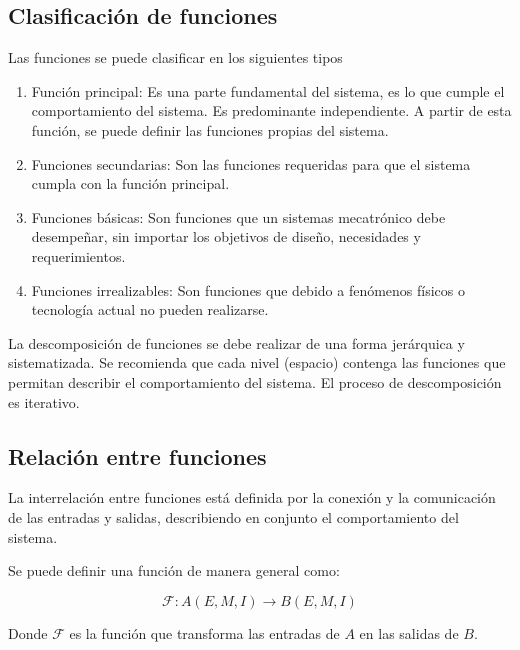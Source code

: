 \subsection{Clasificación de funciones}
Las funciones se puede clasificar en los siguientes tipos
\begin{enumerate}
    \item Función principal: Es una parte fundamental del sistema, es lo que cumple el comportamiento del sistema. Es predominante independiente. A partir de esta función, se puede definir las funciones propias del sistema. 
    
    \item Funciones secundarias: Son las funciones requeridas para que el sistema cumpla con la función principal.
    
    \item Funciones básicas: Son funciones que un sistemas mecatrónico debe desempeñar, sin importar los objetivos de diseño, necesidades y requerimientos.
    
    \item Funciones irrealizables: Son funciones que debido a fenómenos físicos o tecnología actual no pueden realizarse.
\end{enumerate}

La descomposición de funciones se debe realizar de una forma jerárquica y sistematizada. Se recomienda que cada nivel (espacio) contenga las funciones que permitan describir el comportamiento del sistema. El proceso de descomposición es iterativo.

\subsection{Relación entre funciones}

La interrelación entre funciones está definida por la conexión y la comunicación de las entradas y salidas, describiendo en conjunto el comportamiento del sistema.

Se puede definir una función de manera general como:

\[
    \mathcal{F}: A(E, M, I) \to B(E, M, I)
\]

Donde \( \mathcal{F} \) es la función que transforma las entradas de \( A \) en las salidas de \( B \).

